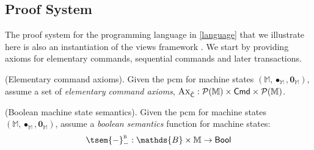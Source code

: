 \subsection{Proof System}

The proof system for the programming language in \ref{language} that we illustrate here is also an instantiation of the views framework \cite{views}. We start by providing axioms for elementary commands, sequential commands and later transactions.

\begin{param}
	(Elementary command axioms).
	Given the pcm for machine states $(\mathbb{M}, \bullet_\mathbb{M}, \mathbf{0}_\mathbb{M})$, assume a set of \emph{elementary command axioms}, $\textsc{Ax}_{\hat{\mathsf{C}}} : \mathcal{P}(\mathbb{M}) \times \mathsf{Cmd} \times \mathcal{P}(\mathbb{M})$.
\end{param}

\begin{param}
	\label{param:boolMachine}
	(Boolean machine state semantics).
	Given the pcm for machine states $(\mathbb{M}, \bullet_\mathbb{M}, \mathbf{0}_\mathbb{M})$, assume a \emph{boolean semantics} function for machine states:
	\[
		\tsem{-}^\textsc{b}_- : \mathds{B} \times \mathbb{M} \rightarrow \mathsf{Bool}
	\]
\end{param}

